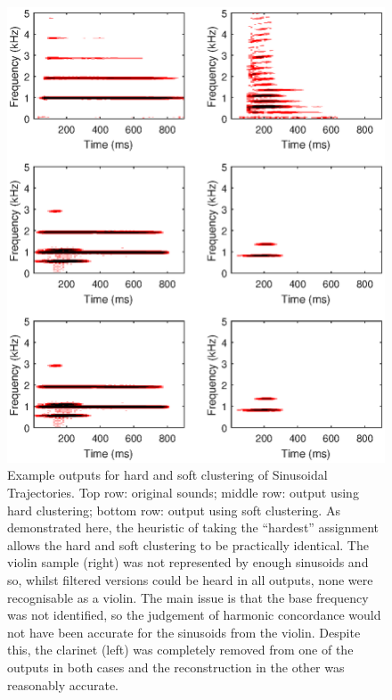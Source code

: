 \documentclass[12pt,a4paper,twoside,openright]{report}
\begin{document}
\begin{figure}
\centering
\includegraphics[width=0.7\linewidth]{../OutputSpectrograms/clusteringCompSinSpec1}
\caption[Example outputs for hard and soft clustering of Sinusoidal Trajectories.]{Example outputs for hard and soft clustering of Sinusoidal Trajectories. Top row: original sounds; middle row: output using hard clustering; bottom row: output using soft clustering. As demonstrated here, the heuristic of taking the ``hardest'' assignment allows the hard and soft clustering to be practically identical. The violin sample (right) was not represented by enough sinusoids and so, whilst filtered versions could be heard in all outputs, none were recognisable as a violin. The main issue is that the base frequency was not identified, so the judgement of harmonic concordance would not have been accurate for the sinusoids from the violin. Despite this, the clarinet (left) was completely removed from one of the outputs in both cases and the reconstruction in the other was reasonably accurate.}
\label{fig:clusteringCompSinSpec1}
\end{figure}
\end{document}
